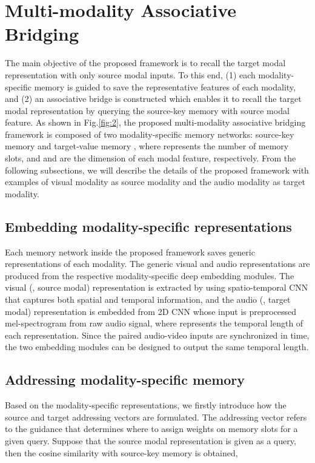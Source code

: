 \documentclass[10pt,twocolumn,letterpaper]{article}
\begin{document}
\section{Multi-modality Associative Bridging}

The main objective of the proposed framework is to recall the target modal representation with only source modal inputs. To this end, (1) each modality-specific memory is guided to save the representative features of each modality, and (2) an associative bridge is constructed which enables it to recall the target modal representation by querying the source-key memory with source modal feature. As shown in Fig.\ref{fig:2}, the proposed multi-modality associative bridging framework is composed of two modality-specific memory networks: source-key memory  and target-value memory , where  represents the number of memory slots, and  and  are the dimension of each modal feature, respectively. From the following subsections, we will describe the details of the proposed framework with examples of visual modality as source modality and the audio modality as target modality.

\subsection{Embedding modality-specific representations}
Each memory network inside the proposed framework saves generic representations of each modality. The generic visual and audio representations are produced from the respective modality-specific deep embedding modules. The visual (\ie, source modal) representation   is extracted by using spatio-temporal CNN that captures both spatial and temporal information, and the audio (\ie, target modal) representation   is embedded from 2D CNN whose input is preprocessed mel-spectrogram from raw audio signal, where  represents the temporal length of each representation. Since the paired audio-video inputs are synchronized in time, the two embedding modules can be designed to output the same temporal length.

\subsection{Addressing modality-specific memory}
Based on the modality-specific representations, we firstly introduce how the source and target addressing vectors are formulated. The addressing vector refers to the guidance that determines where to assign weights on memory slots for a given query. Suppose that the source modal representation  is given as a query, then the cosine similarity with source-key memory  is obtained,
\end{document}
